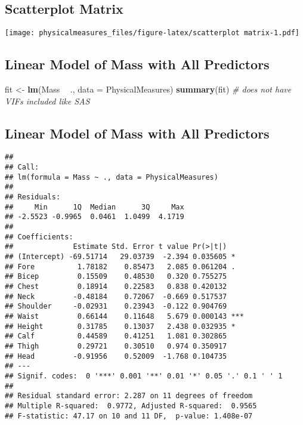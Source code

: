\documentclass[]{article}
\newenvironment{Shaded}{\begin{snugshade}}{\end{snugshade}}
\newcommand{\KeywordTok}[1]{\textcolor[rgb]{0.13,0.29,0.53}{\textbf{#1}}}
\newcommand{\DataTypeTok}[1]{\textcolor[rgb]{0.13,0.29,0.53}{#1}}
\newcommand{\StringTok}[1]{\textcolor[rgb]{0.31,0.60,0.02}{#1}}
\newcommand{\CommentTok}[1]{\textcolor[rgb]{0.56,0.35,0.01}{\textit{#1}}}
\newcommand{\OperatorTok}[1]{\textcolor[rgb]{0.81,0.36,0.00}{\textbf{#1}}}
\newcommand{\NormalTok}[1]{#1}
\begin{document}
\subsection{Scatterplot Matrix}\label{scatterplot-matrix-1}

\texttt{[image: physicalmeasures\_files/figure-latex/scatterplot matrix-1.pdf]}

\subsection{Linear Model of Mass with All
Predictors}\label{linear-model-of-mass-with-all-predictors}

\begin{Shaded}
\begin{Highlighting}[]
\NormalTok{fit <-}\StringTok{ }\KeywordTok{lm}\NormalTok{(Mass }\OperatorTok{~}\StringTok{ }\NormalTok{., }\DataTypeTok{data =}\NormalTok{ PhysicalMeasures)}
\KeywordTok{summary}\NormalTok{(fit) }\CommentTok{# does not have VIFs included like SAS}
\end{Highlighting}
\end{Shaded}

\subsection{Linear Model of Mass with All
Predictors}\label{linear-model-of-mass-with-all-predictors-1}

\begin{verbatim}
## 
## Call:
## lm(formula = Mass ~ ., data = PhysicalMeasures)
## 
## Residuals:
##     Min      1Q  Median      3Q     Max 
## -2.5523 -0.9965  0.0461  1.0499  4.1719 
## 
## Coefficients:
##              Estimate Std. Error t value Pr(>|t|)    
## (Intercept) -69.51714   29.03739  -2.394 0.035605 *  
## Fore          1.78182    0.85473   2.085 0.061204 .  
## Bicep         0.15509    0.48530   0.320 0.755275    
## Chest         0.18914    0.22583   0.838 0.420132    
## Neck         -0.48184    0.72067  -0.669 0.517537    
## Shoulder     -0.02931    0.23943  -0.122 0.904769    
## Waist         0.66144    0.11648   5.679 0.000143 ***
## Height        0.31785    0.13037   2.438 0.032935 *  
## Calf          0.44589    0.41251   1.081 0.302865    
## Thigh         0.29721    0.30510   0.974 0.350917    
## Head         -0.91956    0.52009  -1.768 0.104735    
## ---
## Signif. codes:  0 '***' 0.001 '**' 0.01 '*' 0.05 '.' 0.1 ' ' 1
## 
## Residual standard error: 2.287 on 11 degrees of freedom
## Multiple R-squared:  0.9772, Adjusted R-squared:  0.9565 
## F-statistic: 47.17 on 10 and 11 DF,  p-value: 1.408e-07
\end{verbatim}
\end{document}
